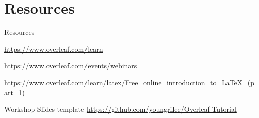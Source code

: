 \documentclass[13pt]{beamer}
\newcommand{\itemA}{\item[\textcolor{black}{\textbullet}]}
\newcommand{\green}{\textcolor{colorgreen}}
\begin{document}
\section{Resources}
\begin{frame}{Resources}
 \begin{fullpageitemize}
 \small
 \itemA\green{\url{https://www.overleaf.com/learn}}
 \itemA\green{\url{https://www.overleaf.com/events/webinars}}
 \itemA \green{\url{https://www.overleaf.com/learn/latex/Free_online_introduction_to_LaTeX_(part_1)}}
 \itemA Workshop Slides template \green{\url{https://github.com/youngrilee/Overleaf-Tutorial}}
 \end{fullpageitemize}
\end{frame}





\end{document}
